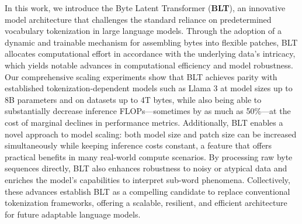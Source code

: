 In this work, we introduce the Byte Latent Transformer (\textbf{BLT}), an innovative model architecture that challenges the standard reliance on predetermined vocabulary tokenization in large language models. Through the adoption of a dynamic and trainable mechanism for assembling bytes into flexible patches, {\textsc BLT} allocates computational effort in accordance with the underlying data’s intricacy, which yields notable advances in computational efficiency and model robustness. Our comprehensive scaling experiments show that {\textsc BLT} achieves parity with established tokenization-dependent models such as Llama 3 at model sizes up to 8B parameters and on datasets up to 4T bytes, while also being able to substantially decrease inference FLOPs—sometimes by as much as 50\%—at the cost of marginal declines in performance metrics. Additionally, {\textsc BLT} enables a novel approach to model scaling: both model size and patch size can be increased simultaneously while keeping inference costs constant, a feature that offers practical benefits in many real-world compute scenarios. By processing raw byte sequences directly, {\textsc BLT} also enhances robustness to noisy or atypical data and enriches the model’s capabilities to interpret sub-word phenomena. Collectively, these advances establish {\textsc BLT} as a compelling candidate to replace conventional tokenization frameworks, offering a scalable, resilient, and efficient architecture for future adaptable language models.

